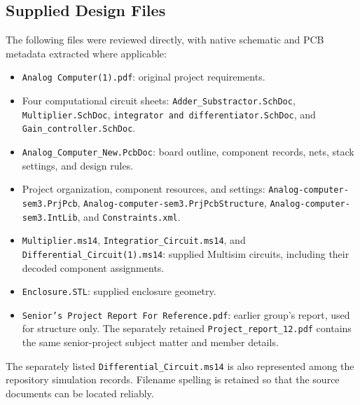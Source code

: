 \documentclass[11pt,a4paper]{article}
\begin{document}
\subsection{Supplied Design Files}
The following files were reviewed directly, with native schematic and PCB metadata extracted where applicable:
\begin{itemize}
\item \texttt{Analog Computer(1).pdf}: original project requirements.
\item Four computational circuit sheets: \texttt{Adder\_\allowbreak{}Substractor.SchDoc}, \texttt{Multiplier.SchDoc}, \texttt{integrator and differentiator.SchDoc}, and \texttt{Gain\_\allowbreak{}controller.SchDoc}.
\item \texttt{Analog\_\allowbreak{}Computer\_\allowbreak{}New.PcbDoc}: board outline, component records, nets, stack settings, and design rules.
\item Project organization, component resources, and settings: \texttt{Analog-computer-sem3.\allowbreak{}PrjPcb}, \texttt{Analog-computer-sem3.\allowbreak{}PrjPcbStructure}, \texttt{Analog-computer-sem3.\allowbreak{}IntLib}, and \texttt{Constraints.xml}.
\item \texttt{Multiplier.ms14}, \texttt{Integratior\_\allowbreak{}Circuit.ms14}, and \texttt{Differential\_\allowbreak{}Circuit(1).ms14}: supplied Multisim circuits, including their decoded component assignments.
\item \texttt{Enclosure.STL}: supplied enclosure geometry.
\item \texttt{Senior's Project Report For Reference.pdf}: earlier group's report, used for structure only. The separately retained \texttt{Project\_\allowbreak{}report\_\allowbreak{}12.pdf} contains the same senior-project subject matter and member details.
\end{itemize}
The separately listed \texttt{Differential\_\allowbreak{}Circuit.ms14} is also represented among the repository simulation records. Filename spelling is retained so that the source documents can be located reliably.
\end{document}
